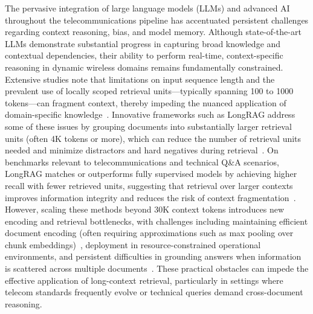\documentclass[sigconf]{acmart}
\begin{document}
The pervasive integration of large language models (LLMs) and advanced AI throughout the telecommunications pipeline has accentuated persistent challenges regarding context reasoning, bias, and model memory. Although state-of-the-art LLMs demonstrate substantial progress in capturing broad knowledge and contextual dependencies, their ability to perform real-time, context-specific reasoning in dynamic wireless domains remains fundamentally constrained. Extensive studies note that limitations on input sequence length and the prevalent use of locally scoped retrieval units—typically spanning 100 to 1000 tokens—can fragment context, thereby impeding the nuanced application of domain-specific knowledge~\cite{ref7,ref9,ref16,ref20,ref21,ref22,ref28,ref37}. Innovative frameworks such as LongRAG address some of these issues by grouping documents into substantially larger retrieval units (often 4K tokens or more), which can reduce the number of retrieval units needed and minimize distractors and hard negatives during retrieval~\cite{ref16}. On benchmarks relevant to telecommunications and technical Q\&A scenarios, LongRAG matches or outperforms fully supervised models by achieving higher recall with fewer retrieved units, suggesting that retrieval over larger contexts improves information integrity and reduces the risk of context fragmentation~\cite{ref16,ref20,ref21}. However, scaling these methods beyond 30K context tokens introduces new encoding and retrieval bottlenecks, with challenges including maintaining efficient document encoding (often requiring approximations such as max pooling over chunk embeddings)~\cite{ref16}, deployment in resource-constrained operational environments, and persistent difficulties in grounding answers when information is scattered across multiple documents~\cite{ref20,ref22}. These practical obstacles can impede the effective application of long-context retrieval, particularly in settings where telecom standards frequently evolve or technical queries demand cross-document reasoning.
\end{document}
